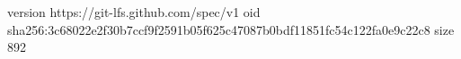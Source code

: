 version https://git-lfs.github.com/spec/v1
oid sha256:3c68022e2f30b7ccf9f2591b05f625c47087b0bdf11851fc54c122fa0e9c22c8
size 892
